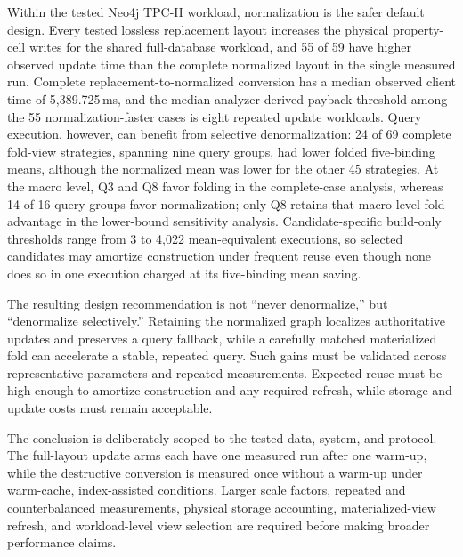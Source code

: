 \documentclass[sigconf]{acmart}
\begin{document}
Within the tested Neo4j TPC-H workload, normalization is the safer default
design. Every tested lossless replacement layout increases the physical
property-cell writes for the shared full-database workload, and 55 of 59 have
higher observed update time than the complete normalized layout in the single
measured run. Complete replacement-to-normalized conversion has a median
observed client time of 5,389.725\,ms, and the median analyzer-derived payback
threshold among the 55 normalization-faster cases is eight repeated update
workloads. Query execution, however, can benefit from selective
denormalization: 24 of 69 complete fold-view strategies, spanning nine query
groups, had lower folded five-binding means, although the normalized mean was
lower for the other 45 strategies. At the macro level, Q3 and Q8 favor folding
in the complete-case analysis, whereas 14 of 16 query groups favor
normalization; only Q8 retains that macro-level fold advantage in the
lower-bound sensitivity analysis. Candidate-specific build-only thresholds
range from 3 to 4,022 mean-equivalent executions, so selected candidates may
amortize construction under frequent reuse even though none does so in one
execution charged at its five-binding mean saving.

The resulting design recommendation is not ``never denormalize,'' but
``denormalize selectively.'' Retaining the normalized graph localizes
authoritative updates and preserves a query fallback, while a carefully matched
materialized fold can accelerate a stable, repeated query. Such gains must be
validated across representative parameters and repeated measurements. Expected
reuse must be high enough to amortize construction and any required refresh,
while storage and update costs must remain acceptable.

The conclusion is deliberately scoped to the tested data, system, and
protocol. The full-layout update arms each have one measured run after one
warm-up, while the destructive conversion is measured once without a warm-up
under warm-cache, index-assisted conditions. Larger scale factors, repeated
and counterbalanced measurements, physical storage accounting,
materialized-view refresh, and workload-level view selection are required
before making broader performance claims.





\end{document}
